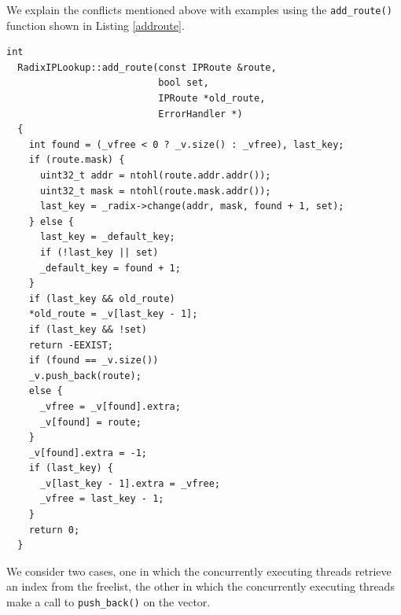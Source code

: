 \documentclass[12pt,a4paper]{article}
\begin{document}
We explain the conflicts mentioned above with examples using the \verb+add_route()+ function shown in  Listing \ref{addroute}.
\begin{lstlisting}[caption = The add\_route function, label=addroute]
  int
  RadixIPLookup::add_route(const IPRoute &route, 
                           bool set, 
                           IPRoute *old_route, 
                           ErrorHandler *)
  {
    int found = (_vfree < 0 ? _v.size() : _vfree), last_key;
    if (route.mask) {
      uint32_t addr = ntohl(route.addr.addr());
      uint32_t mask = ntohl(route.mask.addr());
      last_key = _radix->change(addr, mask, found + 1, set);
    } else {
      last_key = _default_key;
      if (!last_key || set)
      _default_key = found + 1;
    }
    if (last_key && old_route)
    *old_route = _v[last_key - 1];
    if (last_key && !set)
    return -EEXIST;
    if (found == _v.size())
    _v.push_back(route);
    else {
      _vfree = _v[found].extra;
      _v[found] = route;
    }
    _v[found].extra = -1;
    if (last_key) {
      _v[last_key - 1].extra = _vfree;
      _vfree = last_key - 1;
    }
    return 0;
  }
\end{lstlisting}
We consider two cases, one in which the concurrently executing threads retrieve an index from the freelist, the other in which the concurrently executing threads make a call to \verb+push_back()+ on the vector.
\end{document}
